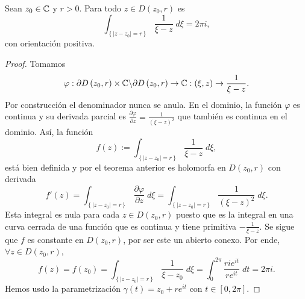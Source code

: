\begin{colorary}
Sean $\displaystyle z_{0} \in \mathbb{C} $ y $\displaystyle r > 0 $. Para todo $\displaystyle z \in D\left(z_{0}, r\right) $ es
\[\int _{ \left\{ \left|z-z_{0}\right|=r\right\} }\frac{1}{\xi-z} \; d\xi = 2\pi i ,\]
con orientación positiva. 
\end{colorary}
\begin{proof}
Tomamos 
\[\varphi: \partial D\left(z_{0}, r\right)\times \mathbb{C} \backslash \partial D\left(z_{0}, r\right)\to \mathbb{C} : \left(\xi, z \right)\to \frac{1}{\xi - z} .\]
Por construcción el denominador nunca se anula. En el dominio, la función $\displaystyle \varphi $ es continua y su derivada parcial es $\displaystyle \frac{\partial \varphi}{\partial z}=\frac{1}{\left(\xi-z\right)^{2}} $ que también es continua en el dominio. 
Así, la función
\[f\left(z\right):= \int _{ \left\{ \left|z-z_{0}\right|=r\right\} }\frac{1}{\xi-z} \; d\xi ,\]
está bien definida y por el teorema anterior es holomorfa en $\displaystyle D\left(z_{0}, r\right) $ con derivada
\[f'\left(z\right)=\int _{ \left\{ \left|z-z_{0}\right|=r\right\} }\frac{\partial \varphi}{\partial z} \; d\xi = \int _{ \left\{ \left|z-z_{0}\right|=r\right\} }\frac{1}{ \left(\xi-z\right)^{2}} \; d\xi .\]
Esta integral es nula para cada $\displaystyle z \in D\left(z_{0}, r\right) $ puesto que es la integral en una curva cerrada de una función que es continua y tiene primitiva $\displaystyle -\frac{1}{\xi-z} $. Se sigue que $\displaystyle f $ es constante en $\displaystyle D\left(z_{0}, r\right) $, por ser este un abierto conexo. Por ende, $\displaystyle \forall z \in D\left(z_{0}, r\right) $,
\[f\left(z\right)=f\left(z_{0}\right)=\int _{ \left\{ \left|z-z_{0}\right|=r\right\} }\frac{1}{\xi-z_{0}} \; d\xi =\int^{2\pi }_{0} \frac{rie^{it}}{re^{it}} \; dt = 2\pi i .\]
Hemos usdo la parametrización $\displaystyle \gamma\left(t\right)=z_{0} + re^{it} $ con $\displaystyle t \in \left[0,2\pi \right]  $. 
\end{proof}
